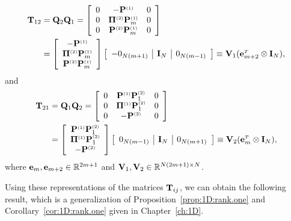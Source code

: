 \begin{align} \label{eq:2D:T12}
\T_{12}&=\Q_2\Q_1 =
\left[
  \begin{array}{ccc}
    0  &      -\POne               &  0     \\
    0  & \PiTwo \POne_{m}          &  0     \\
    0  & \PTwo \POne_{m} &  0
  \end{array}
\right] \\
 &=\left[
  \begin{array}{c}
    -\POne                  \\
	  \PiTwo\POne_{m}   \\
	  \PTwo \POne_{m}  \\
  \end{array}
\right]
\left[
  \begin{array}{c|c|c}-
    0_{N(m+1)} & \I_N & 0_{N(m-1)}
  \end{array}
\right]
\equiv \V_1(\e_{m+2}^{\Tr}\otimes \I_N), \nonumber
\end{align}
%
and
%
\begin{align} \label{eq:2D:T21}
\T_{21}&=\Q_1\Q_2 =
\left[
  \begin{array}{ccc}
    0  &  \POne \PTwo_{1}  &  0     \\
    0  & \PiOne\PTwo_{1}           &  0     \\
    0  &  -\PTwo                   &  0
  \end{array}
\right] \\
&=\left[
  \begin{array}{c}
    \POne \PTwo_{1}    \\
	  \PiOne\PTwo_{1}           \\
	  -\PTwo                    \\
  \end{array}
\right]
\left[
  \begin{array}{c|c|c}
    0_{N(m-1)} & \I_N & 0_{N(m+1)}
  \end{array}
\right]
\equiv \V_2(\e_{m}^{\Tr}\otimes \I_N), \nonumber
\end{align}
%
where $\e_m,\e_{m+2}\in\mathbb{R}^{2m+1}$ and
$\V_1,\V_2\in\mathbb{R}^{N(2m+1)\times N}$.

Using these representations of the matrices $\T_{ij}$, we can obtain the
following result, which is a generalization of
Proposition~\ref{prop:1D:rank.one} and Corollary~\ref{cor:1D:rank.one} given in Chapter~\ref{ch:1D}.

